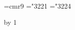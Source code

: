 

\def\hang{\hangindent 3em\indent\ignorespaces}
\font\ninerm=cmr9
\let\mc=\ninerm %
\def\PASCAL{Pascal}
\def\pb{$\.|\ldots\.|$} %
\def\v{\.{\char'174}} %
\def\dleft{[\![} \def\dright{]\!]} %
\mathchardef\RA="3221 %
\mathchardef\BA="3224 %
\def\({} %

\def\title{WEAVE}
\def\contentspagenumber{15} %
\def\topofcontents{\null\vfill
  \titlefalse %
  \def\rheader{\mainfont Appendix D\hfil \contentspagenumber}
  \centerline{\titlefont The {\ttitlefont WEAVE} processor}
  \vskip 15pt
  \centerline{(Version 4.4)}
  \vfill}
\pageno=\contentspagenumber \advance\pageno by 1


